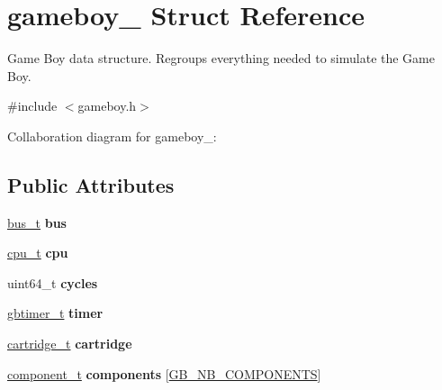 \hypertarget{structgameboy__}{}\section{gameboy\+\_\+ Struct Reference}
\label{structgameboy__}


Game Boy data structure. Regroups everything needed to simulate the Game Boy.  




{\ttfamily \#include $<$gameboy.\+h$>$}



Collaboration diagram for gameboy\+\_\+\+:
\subsection*{Public Attributes}
\begin{DoxyCompactItemize}
\item 
\mbox{\label{structgameboy___a3e572db2262af278d55246e35979bb28}} 
\hyperlink{bus_8h_a68c80bdf896e826e4cb082244ce35427}{bus\+\_\+t} {\bfseries bus}
\item 
\mbox{\label{structgameboy___af9b86ea24a56582e1faacdfcd75c03ad}} 
\hyperlink{structcpu__t}{cpu\+\_\+t} {\bfseries cpu}
\item 
\mbox{\label{structgameboy___affe030fb9feee6da004ec9d16a241fcc}} 
uint64\+\_\+t {\bfseries cycles}
\item 
\mbox{\label{structgameboy___a7df44eaf4c5dcbacec2d232e301499cb}} 
\hyperlink{structgbtimer__t}{gbtimer\+\_\+t} {\bfseries timer}
\item 
\mbox{\label{structgameboy___ad710d1a28ec390e309dec50e1b61eea1}} 
\hyperlink{structcartridge__t}{cartridge\+\_\+t} {\bfseries cartridge}
\item 
\mbox{\label{structgameboy___aee639b066c89c85a5ac21712595a6101}} 
\hyperlink{structcomponent__t}{component\+\_\+t} {\bfseries components} \mbox{[}\hyperlink{gameboy_8h_ad51f6a06f5374e06512370127a878d0c}{G\+B\+\_\+\+N\+B\+\_\+\+C\+O\+M\+P\+O\+N\+E\+N\+TS}\mbox{]}
\item 
\mbox{\label{structgameboy___a8a288b56e7287c68d91304c1edf51bfe}} 

\end{DoxyCompactItemize}
